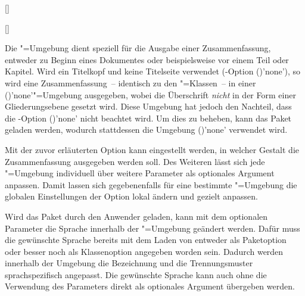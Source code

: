 \begin{Declaration*}{}
\begin{Declaration*}{}
\begin{Declaration*}{}
\begin{Declaration}{[]}
\begin{Declaration}{[]}
\begin{Declaration}{}
\begin{Declaration}[v2.02]{}
\begin{Declaration}[v2.02]{%
}
\begin{Declaration}{}
\begin{Declaration}{}{%
}
\printdeclarationlist%
%
%
Die "=Umgebung dient speziell für die Ausgabe einer 
Zusammenfassung, entweder zu Beginn eines Dokumentes oder beispielsweise vor 
einem Teil oder Kapitel. Wird ein Titelkopf und keine Titelseite verwendet 
(\KOMAScript-Option ()'none'), so 
wird eine Zusammenfassung~-- identisch zu den \KOMAScript"=Klassen~-- in einer 
()'none'"=Umgebung ausgegeben, 
wobei die Überschrift \emph{nicht} in der Form einer Gliederungsebene gesetzt 
wird. Diese Umgebung hat jedoch den Nachteil, dass die \KOMAScript-Option 
()'none' nicht beachtet 
wird. Um dies zu beheben, kann das Paket  geladen werden, 
wodurch stattdessen die Umgebung ()'none' 
verwendet wird.

Mit der zuvor erläuterten Option  kann eingestellt werden, in 
welcher Gestalt die Zusammenfassung ausgegeben werden soll. Des Weiteren lässt 
sich jede "=Umgebung individuell über weitere Parameter 
als optionales Argument anpassen. Damit lassen sich gegebenenfalls für eine 
bestimmte "=Umgebung die globalen Einstellungen 
der Option  lokal ändern und gezielt anpassen. 

Wird das Paket  durch den Anwender geladen, kann mit dem 
optionalen Parameter die 
Sprache innerhalb der "=Umgebung geändert werden. Dafür 
muss die gewünschte Sprache bereits mit dem Laden von  entweder 
als Paketoption oder besser noch als Klassenoption angegeben worden sein. 
Dadurch werden innerhalb der Umgebung die Bezeichnung  und 
die Trennungsmuster sprachspezifisch angepasst. Die gewünschte Sprache kann 
auch ohne die Verwendung des Parameters  
direkt als optionales Argument übergeben werden.


\end{Declaration}
\end{Declaration}
\end{Declaration}
\end{Declaration}
\end{Declaration}
\end{Declaration}
\end{Declaration}
\end{Declaration*}
\end{Declaration*}
\end{Declaration*}
